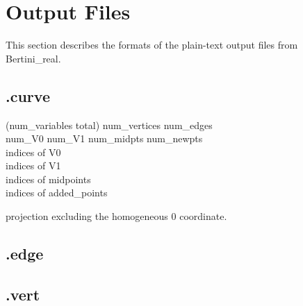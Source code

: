 
\section{Output Files}

This section describes the formats of the plain-text output files from Bertini\_real.

\subsection{.curve}


(num\_variables total) num\_vertices num\_edges \\
num\_V0 num\_V1 num\_midpts num\_newpts \\

indices of V0  \\
indices of V1  \\
indices of midpoints \\
indices of added\_points

projection excluding the homogeneous 0 coordinate.\\


\subsection{.edge}


\subsection{.vert}
